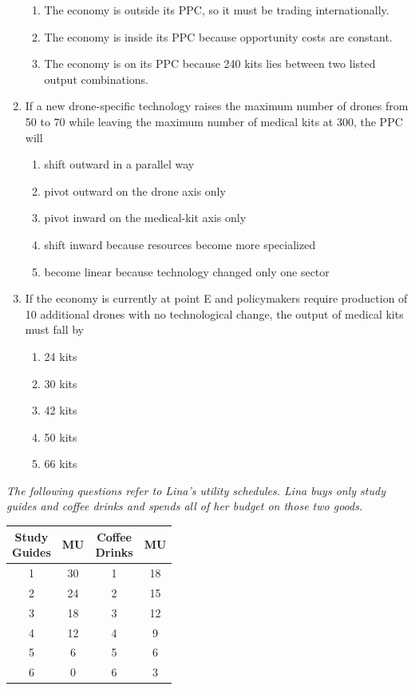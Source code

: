 \documentclass[10pt]{article}
\newenvironment{choiceslist}
  {\begin{enumerate}[label=(\Alph*), leftmargin=1.6em, itemsep=0.12em, topsep=0.18em, parsep=0pt]}
  {\end{enumerate}}
\newenvironment{stimulus}
  {\begin{center}\begin{minipage}{0.96\columnwidth}\footnotesize\itshape\setlength{\tabcolsep}{3pt}\renewcommand{\arraystretch}{0.96}}
  {\end{minipage}\end{center}}
\begin{document}
\begin{multicols*}{2}
\begin{enumerate}[resume*=apq, leftmargin=*, itemsep=0.85em, topsep=0.2em, parsep=0pt]
\begin{choiceslist}
\item The economy is outside its PPC, so it must be trading internationally.
\item The economy is inside its PPC because opportunity costs are constant.
\item The economy is on its PPC because 240 kits lies between two listed output combinations.
\end{choiceslist}
\item If a new drone-specific technology raises the maximum number of drones from 50 to 70 while leaving the maximum number of medical kits at 300, the PPC will
\begin{choiceslist}
\item shift outward in a parallel way
\item pivot outward on the drone axis only
\item pivot inward on the medical-kit axis only
\item shift inward because resources become more specialized
\item become linear because technology changed only one sector
\end{choiceslist}
\item If the economy is currently at point E and policymakers require production of 10 additional drones with no technological change, the output of medical kits must fall by
\begin{choiceslist}
\item 24 kits
\item 30 kits
\item 42 kits
\item 50 kits
\item 66 kits
\end{choiceslist}
\end{enumerate}
\begin{stimulus}
The following questions refer to Lina's utility schedules. Lina buys only study guides and coffee drinks and spends all of her budget on those two goods.

\begin{center}
\begin{tabular}{cccc}
\toprule
\shortstack{Study\\ Guides} & MU & \shortstack{Coffee\\ Drinks} & MU \\
\midrule
1 & 30 & 1 & 18 \\
2 & 24 & 2 & 15 \\
3 & 18 & 3 & 12 \\
4 & 12 & 4 & 9 \\
5 & 6 & 5 & 6 \\
6 & 0 & 6 & 3 \\
\bottomrule
\end{tabular}
\end{center}


\end{stimulus}
\end{multicols*}
\end{document}
